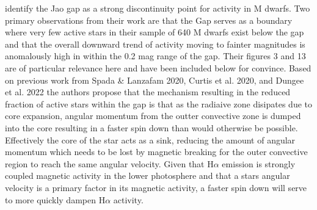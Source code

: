 \citep{Jao2023} identify the Jao gap as a strong discontinuity point for
activity in M dwarfs. Two primary observations from their work are that the Gap
serves as a boundary where very few active stars in their sample of 640 M
dwarfs exist below the gap and that the overall downward trend of activity
moving to fainter magnitudes is anomalously high in within the 0.2 mag range of
the gap. Their figures 3 and 13 are of particular relevance here and have been
included below for convince. Based on previous work from {\color{red}Spada \& Lanzafam 2020},
{\color{red}Curtis et al. 2020, and Dungee et al. 2022} the authors propose that the
mechanism resulting in the reduced fraction of active stars within the gap is
that as the radiaive zone disipates due to core expansion, angular momentum
from the outter convective zone is dumped into the core resulting in a faster
spin down than would otherwise be possible. Effectively the core of the star
acts as a sink, reducing the amount of angular momentum which needs to be lost by
magnetic breaking for the outer convective region to reach the same angular
velocity. Given that H$\alpha$ emission is strongly coupled magnetic activity in the
lower photosphere and that a stars angular velocity is a primary factor in its
magnetic activity, a faster spin down will serve to more quickly dampen H$\alpha$
activity.


%

